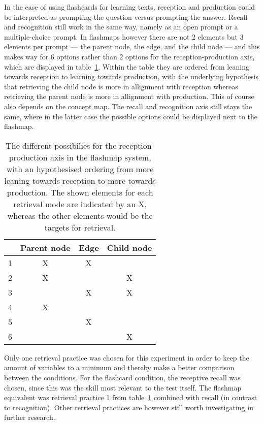 In the case of using flashcards for learning texts, reception and production could be interpreted as prompting the question versus prompting the answer. Recall and recognition still work in the same way, namely as an open prompt or a multiple-choice prompt. In flashmaps however there are not 2 elements but 3 elements per prompt --- the parent node, the edge, and the child node --- and this makes way for 6 options rather than 2 options for the reception-production axis, which are displayed in table~\ref{tab:retrievalmaps}. Within the table they are ordered from leaning towards reception to learning towards production, with the underlying hypothesis that retrieving the child node is more in allignment with reception whereas retrieving the parent node is more in allignment with production. This of course also depends on the concept map. The recall and recognition axis still stays the same, where in the latter case the possible options could be displayed next to the flashmap.

\begin{table}
    \centering
    \begin{tabular}{lccc}
        \hline
         & Parent node & Edge & Child node \\
        \hline
        1 & X & X & \\
        2 & X & & X \\
        3 &  & X & X \\
        4 & X & & \\
        5 &  & X & \\
        6 &  & & X \\
        \hline
    \end{tabular}
    \caption{The different possibilies for the reception-production axis in the flashmap system, with an hypothesised ordering from more leaning towards reception to more towards production. The shown elements for each retrieval mode are indicated by an X, whereas the other elements would be the targets for retrieval.}
    \label{tab:retrievalmaps}
\end{table}

Only one retrieval practice was chosen for this experiment in order to keep the amount of variables to a minimum and thereby make a better comparison between the conditions. For the flashcard condition, the receptive recall was chosen, since this was the skill most relevant to the test itself. The flashmap equivalent was retrieval practice 1 from table~\ref{tab:retrievalmaps} combined with recall (in contrast to recognition). Other retrieval practices are however still worth investigating in further research.

